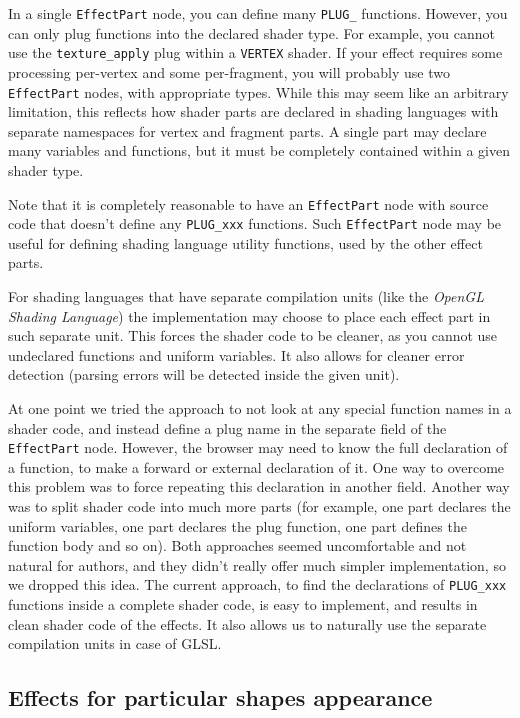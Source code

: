 \documentclass{acmsiggraph}                     %
\begin{document}
In a single \texttt{EffectPart} node, you can define many \texttt{PLUG\_}
functions. However, you can only plug functions into the declared shader
type. For example, you cannot use the \texttt{texture\_apply} plug within
a \texttt{VERTEX} shader.
If your effect requires some processing per-vertex and some per-fragment,
you will probably use two \texttt{EffectPart} nodes, with appropriate types.
While this may seem like an arbitrary limitation,
this reflects how shader parts are declared in shading languages with
separate namespaces for vertex and fragment parts.
A single part may declare many variables and functions,
but it must be completely contained within a given shader type.

Note that it is completely reasonable to have an \texttt{EffectPart} node
with source code that doesn't define any \texttt{PLUG\_xxx} functions.
Such \texttt{EffectPart} node may be useful for defining shading language
utility functions, used by the other effect parts.

For shading languages that have separate compilation units
(like the \emph{OpenGL Shading Language}) the implementation may choose to place
each effect part in such separate unit. This forces the shader code to be
cleaner, as you cannot use undeclared functions and uniform variables.
It also allows for cleaner error detection (parsing errors will be detected
inside the given unit).

At one point we tried the approach
to not look at any special function names in a shader code,
and instead define a plug name in the separate field of the \texttt{EffectPart}
node. However, the browser may need to know the full declaration
of a function, to make a forward or external declaration of it.
One way to overcome this problem was to force repeating this declaration
in another field. Another way was to split shader code into much more
parts (for example, one part declares the uniform variables, one part declares
the plug function, one part defines the function body and so on).
Both approaches seemed uncomfortable and not natural for authors,
and they didn't really offer much simpler implementation, so we dropped this idea.
The current approach, to find the declarations of \texttt{PLUG\_xxx} functions
inside a complete shader code, is easy to implement, and results in clean
shader code of the effects. It also allows us to naturally use
the separate compilation units in case of GLSL.

\subsection{Effects for particular shapes appearance}
\end{document}

